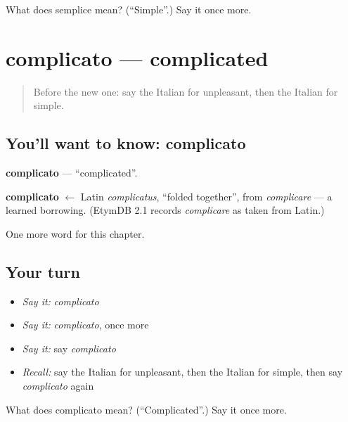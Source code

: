 \begin{tcolorbox}[breakable,colback=teal!4,colframe=teal!35!black,title={Before you move on}]
What does semplice mean? (\textquotedblleft{}Simple\textquotedblright{}.) Say it once more.
\end{tcolorbox}
\section[complicato]{complicato — complicated}

\label{lesson:IT-C157-complicato}



\begin{quote}
Before the new one: say the Italian for unpleasant, then the Italian for simple.
\end{quote}

\subsection*{You'll want to know: complicato}
\textbf{complicato} — \textquotedblleft{}complicated\textquotedblright{}.

\begin{cousinweb}
\textbf{complicato} $\leftarrow$ Latin \emph{complicatus}, \textquotedblleft{}folded together\textquotedblright{}, from \emph{complicare} — a learned borrowing. (EtymDB 2.1 records \emph{complicare} as taken from Latin.)
\end{cousinweb}

\begin{grammarlens}[title={What you've built}]
One more word for this chapter.
\end{grammarlens}

\subsection*{Your turn}
\begin{itemize}
\raggedright
  \item \emph{Say it:} \emph{complicato}
  \item \emph{Say it:} \emph{complicato}, once more
  \item \emph{Say it:} say \emph{complicato}
  \item \emph{Recall:} say the Italian for unpleasant, then the Italian for simple, then say \emph{complicato} again
\end{itemize}

\begin{tcolorbox}[breakable,colback=teal!4,colframe=teal!35!black,title={Before you move on}]
What does complicato mean? (\textquotedblleft{}Complicated\textquotedblright{}.) Say it once more.
\end{tcolorbox}
